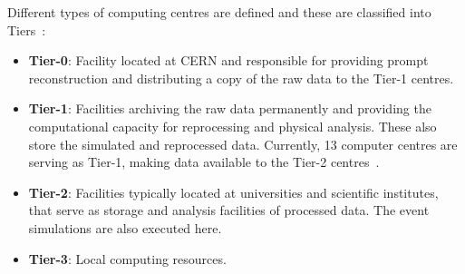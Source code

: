 Different types of computing centres are defined and these are classified into Tiers~\cite{Duckeck:2005rb}:
\begin{itemize}
	\item \textbf{Tier-0}: Facility located at CERN and responsible for providing  prompt reconstruction 
				       and distributing a copy of the raw data to the Tier-1 centres.
	\item \textbf{Tier-1}: Facilities archiving the raw data permanently and providing the computational capacity for reprocessing and physical
				analysis. These also store the simulated and reprocessed data.  Currently, 13 computer centres are serving as Tier-1,  %
				making data available to the Tier-2 centres~\cite{CERN_LHCG_centres}.
	\item \textbf{Tier-2}:  Facilities typically located at universities and scientific institutes, that serve
					as storage and analysis facilities of processed data. The event simulations
					are also executed here. 
	\item \textbf{Tier-3}: Local computing resources. %
\end{itemize}

